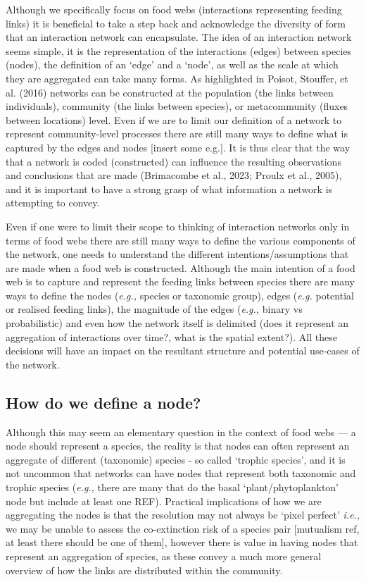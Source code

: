 \documentclass[
]{article}
\begin{document}
Although we specifically focus on food webs (interactions representing
feeding links) it is beneficial to take a step back and acknowledge the
diversity of form that an interaction network can encapsulate. The idea
of an interaction network seems simple, it is the representation of the
interactions (edges) between species (nodes), the definition of an
`edge' and a `node', as well as the scale at which they are aggregated
can take many forms. As highlighted in Poisot, Stouffer, et al. (2016)
networks can be constructed at the population (the links between
individuals), community (the links between species), or metacommunity
(fluxes between locations) level. Even if we are to limit our definition
of a network to represent community-level processes there are still many
ways to define what is captured by the edges and nodes {[}insert some
e.g.{]}. It is thus clear that the way that a network is coded
(constructed) can influence the resulting observations and conclusions
that are made (Brimacombe et al., 2023; Proulx et al., 2005), and it is
important to have a strong grasp of what information a network is
attempting to convey.

Even if one were to limit their scope to thinking of interaction
networks only in terms of food webs there are still many ways to define
the various components of the network, one needs to understand the
different intentions/assumptions that are made when a food web is
constructed. Although the main intention of a food web is to capture and
represent the feeding links between species there are many ways to
define the nodes (\emph{e.g.,} species or taxonomic group), edges
(\emph{e.g.} potential or realised feeding links), the magnitude of the
edges (\emph{e.g.,} binary vs probabilistic) and even how the network
itself is delimited (does it represent an aggregation of interactions
over time?, what is the spatial extent?). All these decisions will have
an impact on the resultant structure and potential use-cases of the
network.

\subsection{How do we define a node?}\label{how-do-we-define-a-node}

Although this may seem an elementary question in the context of food
webs --- a node should represent a species, the reality is that nodes
can often represent an aggregate of different (taxonomic) species - so
called `trophic species', and it is not uncommon that networks can have
nodes that represent both taxonomic and trophic species (\emph{e.g.,}
there are many that do the basal `plant/phytoplankton' node but include
at least one REF). Practical implications of how we are aggregating the
nodes is that the resolution may not always be `pixel perfect'
\emph{i.e.,} we may be unable to assess the co-extinction risk of a
species pair {[}mutualism ref, at least there should be one of them{]},
however there is value in having nodes that represent an aggregation of
species, as these convey a much more general overview of how the links
are distributed within the community.
\end{document}
